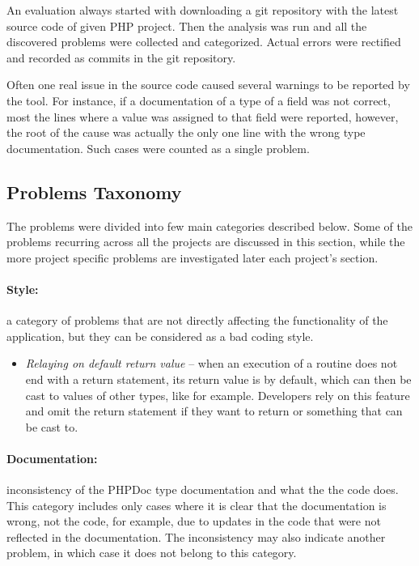 An evaluation always started with downloading a git repository with the 
latest source code of given PHP project. Then the analysis was run and 
all the discovered problems were collected and categorized.
Actual errors were rectified and recorded as commits in the 
git repository. 

Often one real issue in the source code caused several 
warnings to be reported by the tool. For instance, if a documentation 
of a type of a field was not correct, most the lines where 
a value was assigned to that field were reported, however, the 
root of the cause was actually the only one line with the 
wrong type documentation. Such cases were counted as a 
single problem.

\subsection{Problems Taxonomy}

The problems were divided into few main categories 
described below. Some of the problems recurring 
across all the projects are discussed in this section, 
while the more project specific problems are 
investigated later each project's section.

\paragraph*{Style:} a category of problems that 
are not directly affecting the functionality of the 
application, but they can be considered as a bad 
coding style. 

\begin{itemize}
    \item[] \textit{Relaying on default return value} -- when an execution of a 
        routine does not end with a return statement, its 
        return value is  by default, which can then 
        be cast to values of other types, like  
        for example. Developers rely on this feature and omit 
        the return statement if they want to return  or 
        something that  can be cast to.
\end{itemize}

\paragraph*{Documentation:} inconsistency of the PHPDoc type 
documentation and what the the code does. This category includes 
only cases where it is clear that the documentation is wrong, not the code, 
for example, due to updates in the code that were not reflected 
in the documentation. The inconsistency may also indicate 
another problem, in which case it does not belong to this category. 

